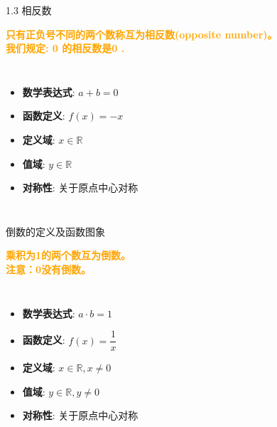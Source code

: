 \documentclass[aspectratio=169]{ctexbeamer} %
\date{\today}
\begin{document}
\begin{frame}{1.3 相反数}
\begin{definition}
\textbf{\textcolor{orange}{只有正负号不同的两个数称互为相反数(opposite number)。\\
我们规定: 0 的相反数是0 .}}
\end{definition}
\begin{columns}
\begin{itemize}
    \item \textbf{数学表达式}:  $a + b = 0$
    \item \textbf{函数定义}:  $f(x) = -x$
    \item \textbf{定义域}: $x \in \mathbb{R}$
    \item \textbf{值域}: $y \in \mathbb{R}$
    \item \textbf{对称性}: 关于原点中心对称
\end{itemize}


\begin{figure}
\centering
\scalebox{1.8}{}
\end{figure}

\end{columns}
\end{frame}

\begin{frame}{倒数的定义及函数图象}
\begin{definition}
\textbf{\textcolor{orange}{乘积为1的两个数互为倒数。\\
注意：0没有倒数。}}
\end{definition}
\begin{columns}
\begin{itemize}
    \item \textbf{数学表达式}:  $a \cdot b = 1$
    \item \textbf{函数定义}:  $f(x) = \dfrac{1}{x}$
    \item \textbf{定义域}: $x \in \mathbb{R}, x \neq 0$
    \item \textbf{值域}: $y \in \mathbb{R}, y \neq 0$
    \item \textbf{对称性}: 关于原点中心对称
\end{itemize}

\begin{figure}
\centering
\scalebox{1.8}{}
\end{figure}
\end{columns}
\end{frame}
\end{document}
